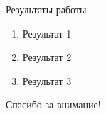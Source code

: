 
\begin{frame}{Результаты работы}
    \begin{enumerate}
        \item Результат 1
        \item Результат 2
        \item Результат 3
    \end{enumerate}
\end{frame}

\begin{frame}[standout]
    Спасибо за внимание!
\end{frame}
